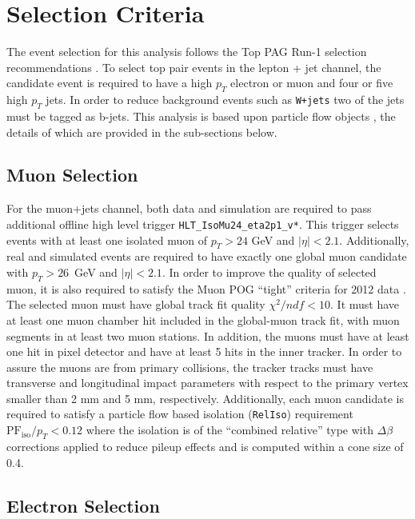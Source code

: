 \documentclass{cmspaperpdf}
\begin{document}
\section{Selection Criteria}
\label{sec:selection}

The event selection for this analysis follows the Top PAG Run-1 selection recommendations \cite{top_pag}.  To select top pair events in the lepton + jet channel, the candidate event is required to have a high $p_T$ electron or muon and four or five high $p_T$ jets.  In order to reduce background events such as \texttt{W+jets} two of the jets must be tagged as b-jets.   This analysis is based upon particle flow objects \cite{particle_flow}, the details of which are provided in the sub-sections below. 

\subsection{Muon Selection}

For the muon+jets channel, both data and simulation are required to pass additional offline high level trigger \texttt{HLT\_IsoMu24\_eta2p1\_v*}. This trigger selects events with at least one isolated muon of $p_T>24$ GeV and $|\eta|<2.1$.  Additionally, real and simulated events are required to have exactly one global muon candidate with $p_T>26$~GeV and $|\eta|<2.1$. In order to improve the quality of selected muon, it is also required to satisfy the Muon POG ``tight'' criteria for 2012 data \cite{Muon_POG}. The selected muon must have global track fit quality $\chi^2/ndf<10$. It must have at least one muon chamber hit included in the global-muon track fit, with muon segments in at least two muon stations. In addition, the muons must have at least one hit in pixel detector and have at least 5 hits in the inner tracker. In order to assure the muons are from primary collisions, the tracker tracks must have transverse and longitudinal impact parameters with respect to the primary vertex smaller than 2 mm and 5 mm, respectively.
Additionally, each muon candidate is required to satisfy a particle flow based isolation (\texttt{RelIso}) requirement $\mathrm{PF}_\mathrm{iso}/p_{T}<0.12$ where the isolation is of the ``combined relative'' type with $\Delta\beta$ corrections applied to reduce pileup effects and is computed within a cone size of 0.4. 

\subsection{Electron Selection}
\end{document}
